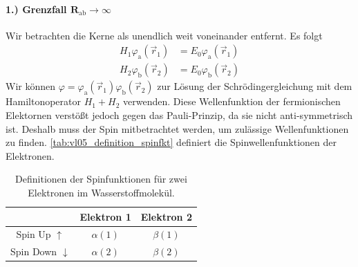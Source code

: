 \paragraph{1.) Grenzfall $\bm{R_\mathrm{ab}\to\infty}$}
	Wir betrachten die Kerne als unendlich weit voneinander entfernt. Es folgt
	\begin{align}
		\label{eq:3.25}
		H_1 \varphi_\text{a} \left( \vec{r}_{1} \right) &= E_0 \varphi_\text{a} \left( \vec{r}_{1} \right)  \\
		\label{eq:3.26}
		H_2 \varphi_\text{b}\left( \vec{r}_{2} \right) &= E_0 \varphi_\text{b} \left( \vec{r}_{2} \right)  
	\end{align}
	Wir können $ \varphi = \varphi_\text{a}\left( \vec{r}_{1} \right) \varphi_\text{b} \left( \vec{r}_{2} \right) $ zur Lösung der Schrödingergleichung mit dem Hamiltonoperator $H_1+H_2$ verwenden.
	Diese Wellenfunktion der fermionischen Elektornen verstößt jedoch gegen das Pauli-Prinzip, da sie nicht anti-symmetrisch ist. 
	Deshalb muss der Spin mitbetrachtet werden, um zulässige Wellenfunktionen zu finden.
	\autoref{tab:vl05_definition_spinfkt} definiert die Spinwellenfunktionen der Elektronen.
	\begin{table}[H]
		\centering
		\caption{Definitionen der Spinfunktionen für zwei Elektronen im Wasserstoffmolekül.}
		\label{tab:vl05_definition_spinfkt}
		\begin{tabular}{|c|cc|}\hline
			&Elektron 1&Elektron 2\\\hline
			Spin Up $\uparrow$ & $\alpha(1)$ & $\beta(1)$\\
			Spin Down $\downarrow$ & $\alpha(2)$ & $\beta(2)$\\\hline
		\end{tabular}
	\end{table}
 
